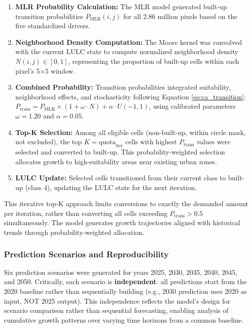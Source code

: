 \documentclass[12pt,a4paper]{article}
\begin{document}
\begin{enumerate}
\item \textbf{MLR Probability Calculation:} The MLR model generated built-up transition probabilities $P_{\text{MLR}}(i,j)$ for all 2.86 million pixels based on the five standardized drivers.

\item \textbf{Neighborhood Density Computation:} The Moore kernel was convolved with the current LULC state to compute normalized neighborhood density $N(i,j) \in [0,1]$, representing the proportion of built-up cells within each pixel's 5$\times$5 window.

\item \textbf{Combined Probability:} Transition probabilities integrated suitability, neighborhood effects, and stochasticity following Equation \ref{eq:ca_transition}: $P_{\text{trans}} = P_{\text{MLR}} \times (1 + \omega \cdot N) + \alpha \cdot U(-1,1)$, using calibrated parameters $\omega=1.20$ and $\alpha=0.05$.

\item \textbf{Top-K Selection:} Among all eligible cells (non-built-up, within circle mask, not excluded), the top $K = \text{quota}_{\text{iter}}$ cells with highest $P_{\text{trans}}$ values were selected and converted to built-up. This probability-weighted selection allocates growth to high-suitability areas near existing urban zones.

\item \textbf{LULC Update:} Selected cells transitioned from their current class to built-up (class 4), updating the LULC state for the next iteration.
\end{enumerate}

This iterative top-K approach limits conversions to exactly the demanded amount per iteration, rather than converting all cells exceeding $P_{\text{trans}} > 0.5$ simultaneously. The model generates growth trajectories aligned with historical trends through probability-weighted allocation.

\subsubsection{Prediction Scenarios and Reproducibility}

Six prediction scenarios were generated for years 2025, 2030, 2035, 2040, 2045, and 2050. Critically, each scenario is \textbf{independent}: all predictions start from the 2020 baseline rather than sequentially building (e.g., 2030 prediction uses 2020 as input, NOT 2025 output). This independence reflects the model's design for scenario comparison rather than sequential forecasting, enabling analysis of cumulative growth patterns over varying time horizons from a common baseline.
\end{document}
